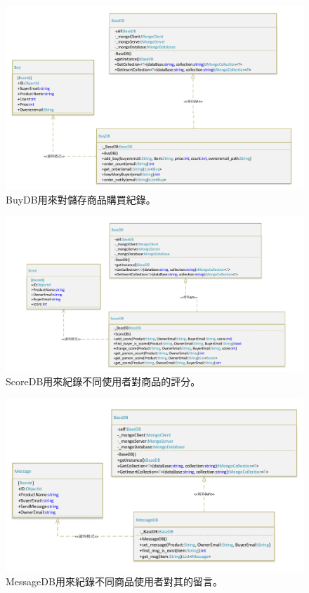 \documentclass{scrreprt}
\begin{document}
\begin{CJK}{UTF8}{bkai}
\begin{figure}
	\includegraphics[width=\textwidth]{BuyDB.pdf}
	\caption{BuyDB用來對儲存商品購買紀錄。}
\end{figure}

\begin{figure}
	\includegraphics[width=\textwidth]{ScoreDB.pdf}
	\caption{ScoreDB用來紀錄不同使用者對商品的評分。}
\end{figure}

\begin{figure}
	\includegraphics[width=\textwidth]{MessageDB.pdf}
	\caption{MessageDB用來紀錄不同商品使用者對其的留言。}
\end{figure}



\end{CJK}
\end{document}
